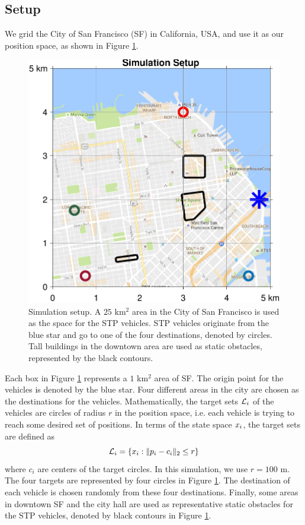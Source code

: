\subsection{Setup \label{sec:city_simSetup}}
We grid the City of San Francisco (SF) in California, USA, and use it as our position space, as shown in Figure \ref{fig:sf_setup}. 
\begin{figure}[H]
  \centering
  \includegraphics[width=\columnwidth]{figs/sf_setup}
  \caption{Simulation setup. A $25$ km$^2$ area in the City of San Francisco is used as the space for the STP vehicles. STP vehicles originate from the blue star and go to one of the four destinations, denoted by circles. Tall buildings in the downtown area are used as static obstacles, represented by the black contours.}
  \label{fig:sf_setup}
\end{figure}
Each box in Figure \ref{fig:sf_setup} represents a $1$ km$^2$ area of SF. The origin point for the vehicles is denoted by the blue star. Four different areas in the city are chosen as the destinations for the vehicles. Mathematically, the target sets $\mathcal{L}_i$ of the vehicles are circles of radius $r$ in the position space, i.e. each vehicle is trying to reach some desired set of positions. In terms of the state space $x_i$, the target sets are defined as
\begin{equation}
\label{eq:target_sim}
\mathcal{L}_i = \{x_i: \|p_i - c_i\|_2 \le r\}
\end{equation}
\noindent where $c_i$ are centers of the target circles. In this simulation, we use $r = 100$ m. The four targets are represented by four circles in Figure \ref{fig:sf_setup}. The destination of each vehicle is chosen randomly from these four destinations. Finally, some areas in downtown SF and the city hall are used as representative static obstacles for the STP vehicles, denoted by black contours in Figure \ref{fig:sf_setup}.

